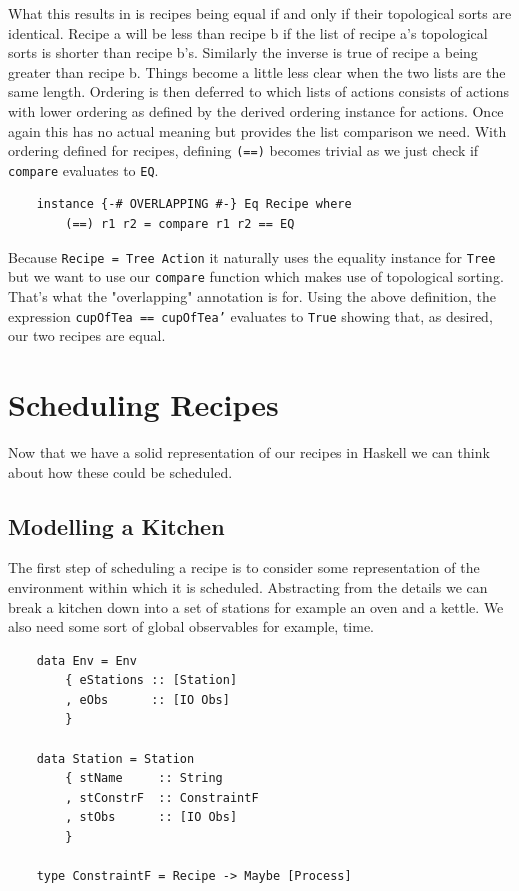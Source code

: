 \documentclass[11pt]{article}
\begin{document}
\medbreak

What this results in is recipes being equal if and only if their topological sorts are identical.
Recipe a will be less than recipe b if the list of recipe a's topological sorts is shorter than recipe b's.
Similarly the inverse is true of recipe a being greater than recipe b. Things become a little less
clear when the two lists are the same length. Ordering is then deferred to which lists of actions
consists of actions with lower ordering as defined by the derived ordering instance for actions.
Once again this has no actual meaning but provides the list comparison we need. With ordering defined for recipes,
defining \texttt{(==)} becomes trivial as we just check if \texttt{compare} evaluates to \texttt{EQ}.

\begin{lstlisting}
    instance {-# OVERLAPPING #-} Eq Recipe where
        (==) r1 r2 = compare r1 r2 == EQ
\end{lstlisting}

Because \texttt{Recipe = Tree Action} it naturally uses the equality instance for
\texttt{Tree} but we want to use our \texttt{compare} function which makes use of topological sorting.
That's what the "overlapping" annotation is for. Using the above definition, the expression
\texttt{cupOfTea == cupOfTea'} evaluates to \texttt{True} showing that, as desired, our two recipes are equal.

\section{Scheduling Recipes}

Now that we have a solid representation of our recipes in Haskell we can think about how
these could be scheduled.

\subsection{Modelling a Kitchen}

The first step of scheduling a recipe is to consider some representation of the
environment within which it is scheduled. Abstracting from the details we can
break a kitchen down into a set of stations for example an oven and a kettle.
We also need some sort of global observables for example, time.

\begin{lstlisting}
    data Env = Env
        { eStations :: [Station]
        , eObs      :: [IO Obs]
        }

    data Station = Station
        { stName     :: String
        , stConstrF  :: ConstraintF
        , stObs      :: [IO Obs]
        }

    type ConstraintF = Recipe -> Maybe [Process]
\end{lstlisting}
\end{document}
